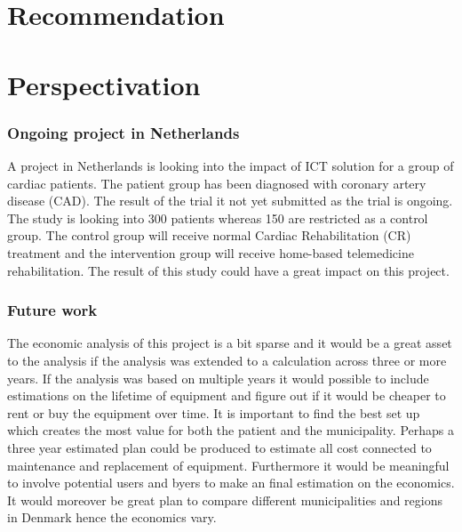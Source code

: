 
\chapter{Recommendation}

\chapter{Perspectivation}

\subsection{Ongoing project in Netherlands}

A project in Netherlands is looking into the impact of ICT solution for a group of cardiac patients. The patient group has been diagnosed with coronary artery disease (CAD). The result of the trial it not yet submitted as the trial is ongoing. The study is looking into 300 patients whereas 150 are restricted as a control group. The control group will receive normal Cardiac Rehabilitation (CR) treatment and the intervention group will receive home-based telemedicine rehabilitation\cite{CAD}. 
The result of this study could have a great impact on this project.

\subsection{Future work}


The economic analysis of this project is a bit sparse and it would be a great asset to the analysis if the analysis was extended to a calculation across three or more years. If the analysis was based on multiple years it would possible to include estimations on the lifetime of equipment and figure out if it would be cheaper to rent or buy the equipment over time. It is important to find the best set up which creates the most value for both the patient and the municipality. Perhaps a three year estimated plan could be produced to estimate all cost connected to maintenance and replacement of equipment. Furthermore it would be meaningful to involve potential users and byers to make an final estimation on the economics. 
It would moreover be great plan to compare different municipalities and regions in Denmark hence the economics vary. \\

